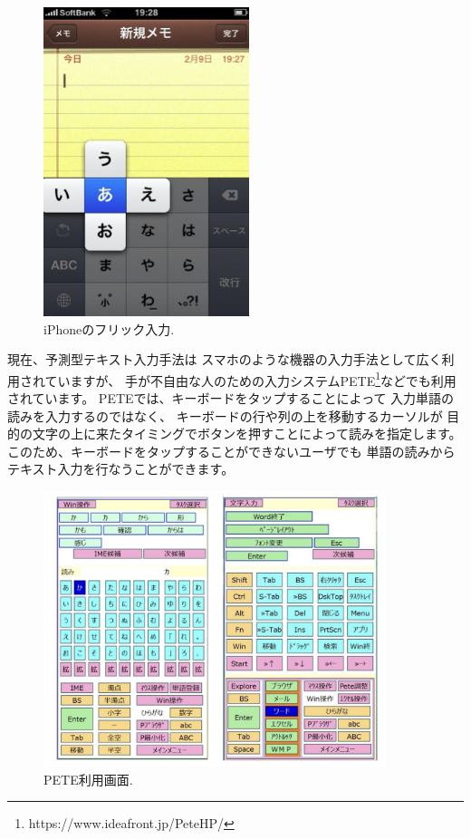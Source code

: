 \documentclass[topics]{compsoft} %
\begin{document}
\begin{figure}[h]
  \centerline{\includegraphics[width=6cm,bb=0 0 294 442]{figures/1691febad27439d3bf44232c54dcb1e8.png}}
  \caption{iPhoneのフリック入力.}
  \label{flick}
\end{figure}

現在、予測型テキスト入力手法は
スマホのような機器の入力手法として広く利用されていますが、
手が不自由な人のための入力システムPETE\footnote{
  \textsf{https:{\slash}{\slash}www.ideafront.jp{\slash}PeteHP{\slash}}
}などでも利用されています。
PETEでは、キーボードをタップすることによって
入力単語の読みを入力するのではなく、
キーボードの行や列の上を移動するカーソルが
目的の文字の上に来たタイミングでボタンを押すことによって読みを指定します。
このため、キーボードをタップすることができないユーザでも
単語の読みからテキスト入力を行なうことができます。

\begin{figure}[h]
  \includegraphics[width=10cm,bb=0 0 1456 1172]{figures/a2f652e2f488b96974e92f8198f49469.jpg}
  \caption{PETE利用画面.}
  \label{pete}
\end{figure}
\end{document}
